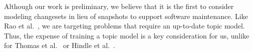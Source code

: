 Although our work is preliminary, we believe that it is the first to consider modeling changesets in lieu of snapshots to support software maintenance. Like Rao et al.~\cite{Rao-etal:2011}, we are targeting problems that require an up-to-date topic model. Thus, the expense of training a topic model is a key consideration for us, unlike for Thomas et al.~\cite{Thomas-etal:2011} or Hindle et al.~\cite{Hindle-etal:2009,Hindle_etal:2012}.
